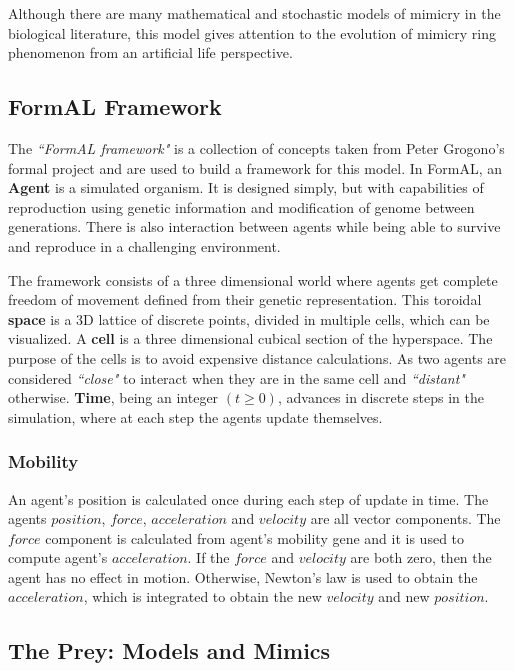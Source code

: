 \documentclass[letterpaper]{article}
\numberwithin{equation}{section}
\begin{document}
Although there are many mathematical and stochastic models of mimicry in the biological literature, this model gives attention to the evolution of mimicry ring phenomenon from an artificial life perspective.

\subsection{FormAL Framework}
The \textsl{``FormAL framework"} is a collection of concepts taken from Peter Grogono's \gls{formal} project \citep{grogono2003} and are used to build a framework for this model. In FormAL, an \textbf{Agent} is a simulated organism. It is designed simply, but with capabilities of reproduction using genetic information and modification of genome between generations. There is also interaction between agents while being able to survive and reproduce in a challenging environment.

The framework consists of a three dimensional world where agents get complete freedom of movement defined from their genetic representation. This toroidal \textbf{space} is a 3D lattice of discrete points, divided in multiple cells, which can be visualized. A \textbf{cell} is a three dimensional cubical section of the hyperspace. The purpose of the cells is to avoid expensive distance calculations. As two agents are considered \textsl{``close"} to interact when they are in the same cell and \textsl{``distant"} otherwise. \textbf{Time}, being an integer \( (t \geq 0) \), advances in discrete steps in the simulation, where at each step the agents update themselves.

\subsubsection{Mobility}
An agent's position is calculated once during each step of update in time. The agents \(position\), \(force\), \(acceleration\) and \(velocity\) are all vector components. The \(force\) component is calculated from agent's mobility gene and it is used to compute agent's \(acceleration\). If the \(force\) and \(velocity\) are both zero, then the agent has no effect in motion. Otherwise, Newton's law is used to obtain the \(acceleration\), which is integrated to obtain the new \(velocity\) and new \(position\).

\subsection{The Prey: Models and Mimics}
\end{document}
